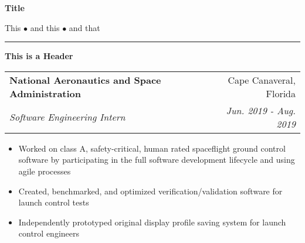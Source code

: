 \documentclass[letterpaper,11pt]{article}
\makeatletter
\newcommand{\resitem}[1]{\item #1 \vspace{-3pt}}
\newcommand{\colfill}{@{\extracolsep{\fill}}}
\newcommand{\ressubheading}[4]{
\begin{tabular*}{6.5in}{l\colfill r}
		\textbf{#1} & #2 \\
		\textit{#3} & \textit{#4} \\
\end{tabular*}\vspace{-6pt}}
\makeatother
\begin{document}
\begin{center}
\textbf{\Large Title}
\end{center}
\vspace{-1.5\baselineskip}
\begin{center}
    This $\bullet$ and this $\bullet$ and that
\end{center}
\vspace{-1.5\baselineskip}
\rule{1.0\textwidth}{1.5pt}
\vspace{0.1\baselineskip}
\newline

\begin{minipage}{0.1\textwidth}
    \textbf{This is a Header}
\end{minipage}
\hspace{0.04\textwidth}
\begin{minipage}{0.8\textwidth}
    \ressubheading{National Aeronautics and Space Administration}{Cape Canaveral, Florida}{Software Engineering Intern}{Jun. 2019 - Aug. 2019}
 	\begin{itemize}
 		\resitem{Worked on class A, safety-critical, human rated spaceflight ground control software by participating in the full software development lifecycle and using agile processes}
        \resitem{Created, benchmarked, and optimized verification/validation software for launch control tests}
 		\resitem{Independently prototyped original display profile saving system for launch control engineers}
 	\end{itemize}
\end{minipage}
\end{document}
